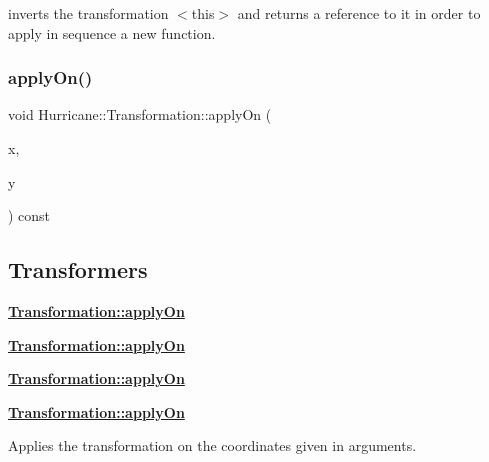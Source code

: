 inverts the transformation {\ttfamily $<$this$>$} and returns a reference to it in order to apply in sequence a new function. \mbox{\label{classHurricane_1_1Transformation_ad37365bfd47851ca33519bb9a05b5402}} 
\subsubsection{\texorpdfstring{apply\+On()}{applyOn()}\hspace{0.1cm}{\footnotesize\ttfamily [1/4]}}
{\footnotesize\ttfamily void Hurricane\+::\+Transformation\+::apply\+On (\begin{DoxyParamCaption}\item[{\mbox{\hyperlink{group__DbUGroup_ga4fbfa3e8c89347af76c9628ea06c4146}{Db\+U\+::\+Unit}} \&}]{x,  }\item[{\mbox{\hyperlink{group__DbUGroup_ga4fbfa3e8c89347af76c9628ea06c4146}{Db\+U\+::\+Unit}} \&}]{y }\end{DoxyParamCaption}) const}

\hypertarget{classHurricane_1_1Transformation_secTransformationTransformers}{}\subsection{Transformers}\label{classHurricane_1_1Transformation_secTransformationTransformers}
{\bfseries \mbox{\hyperlink{classHurricane_1_1Transformation_ad37365bfd47851ca33519bb9a05b5402}{Transformation\+::apply\+On}}}

{\bfseries \mbox{\hyperlink{classHurricane_1_1Transformation_ad37365bfd47851ca33519bb9a05b5402}{Transformation\+::apply\+On}}}

{\bfseries \mbox{\hyperlink{classHurricane_1_1Transformation_ad37365bfd47851ca33519bb9a05b5402}{Transformation\+::apply\+On}}}

{\bfseries \mbox{\hyperlink{classHurricane_1_1Transformation_ad37365bfd47851ca33519bb9a05b5402}{Transformation\+::apply\+On}}}

Applies the transformation on the coordinates given in arguments. \mbox{\label{classHurricane_1_1Transformation_ae73ca0f0e10d85267ef685d94eda9bcc}} 
